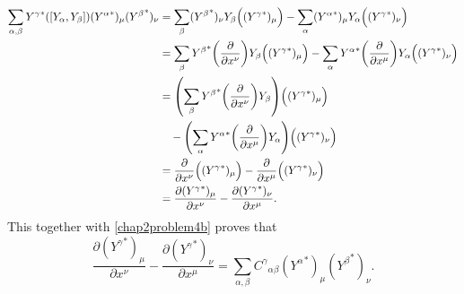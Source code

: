 \documentclass{note}
\numberwithin{equation}{chapter}
\newcommand{\pdv}[2]{\frac{\partial #1}{\partial #2}}
\begin{document}
\begin{align*}
  \sum_{\alpha,\beta}
  {Y^\gamma}^*([Y_\alpha, Y_\beta]) ({Y^\alpha}^*)_\mu({Y^\beta}^*)_\nu
   & = \sum_\beta ({Y^\beta}^*)_\nu Y_\beta\Big(({Y^\gamma}^*)_\mu\Big)
  - \sum_\alpha ({Y^\alpha}^*)_\mu Y_\alpha\Big(({Y^\gamma}^*)_\nu\Big)   \\
   & = \sum_\beta {Y^\beta}^*\prn{\pdv{}{x^\nu}}Y_\beta
  \Big(({Y^\gamma}^*)_\mu\Big)
  - \sum_\alpha {Y^\alpha}^*\prn{\pdv{}{x^\mu}}Y_\alpha
  \Big(({Y^\gamma}^*)_\nu\Big)                                            \\
   & = \prn{\sum_\beta {Y^\beta}^*\prn{\pdv{}{x^\nu}}Y_\beta}
  \Big(({Y^\gamma}^*)_\mu\Big)                                            \\
   & \quad - \prn{\sum_\alpha {Y^\alpha}^*\prn{\pdv{}{x^\mu}}Y_\alpha}
  \Big(({Y^\gamma}^*)_\nu\Big)                                            \\
   & = \pdv{}{x^\nu}\Big(({Y^\gamma}^*)_\mu\Big)
  - \pdv{}{x^\mu}\Big(({Y^\gamma}^*)_\nu\Big)                             \\
   & = \pdv{({Y^\gamma}^*)_\mu}{x^\nu} - \pdv{({Y^\gamma}^*)_\nu}{x^\mu}.
\end{align*}
This together with \eqref{chap2problem4b} proves that
\begin{equation*}
  \pdv{({Y^\gamma}^*)_\mu}{x^\nu} - \pdv{({Y^\gamma}^*)_\nu}{x^\mu} =
  \sum_{\alpha,\beta} {C^\gamma}_{\alpha\beta}
  ({Y^\alpha}^*)_\mu({Y^\beta}^*)_\nu.
\end{equation*}
\end{document}
